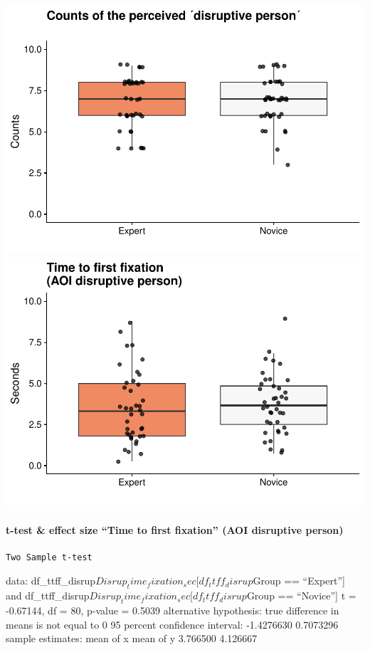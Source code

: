 \documentclass[
]{article}
\begin{document}
\includegraphics{expertise_2024_09_26_no_outlierdetection_MK_files/figure-latex/ttff_disrup-1.pdf}
\includegraphics{expertise_2024_09_26_no_outlierdetection_MK_files/figure-latex/ttff_disrup-2.pdf}

\paragraph{t-test \& effect size ``Time to first fixation'' (AOI
disruptive
person)}\label{t-test-effect-size-time-to-first-fixation-aoi-disruptive-person}

\begin{verbatim}
Two Sample t-test
\end{verbatim}

data: df\_ttff\_disrup\(Disrup_time_fixation_sec[df_ttff_disrup\)Group
== ``Expert''{]} and
df\_ttff\_disrup\(Disrup_time_fixation_sec[df_ttff_disrup\)Group ==
``Novice''{]} t = -0.67144, df = 80, p-value = 0.5039 alternative
hypothesis: true difference in means is not equal to 0 95 percent
confidence interval: -1.4276630 0.7073296 sample estimates: mean of x
mean of y 3.766500 4.126667
\end{document}
